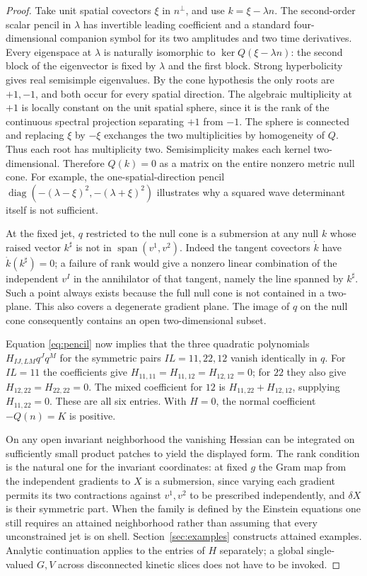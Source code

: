 \documentclass[11pt]{article}
\begin{document}
\begin{proof}
Take unit spatial covectors \(\xi\) in \(n^\perp\), and use \(k=\xi-\lambda n\). The second-order scalar pencil in \(\lambda\) has invertible leading coefficient and a standard four-dimensional companion symbol for its two amplitudes and two time derivatives. Every eigenspace at \(\lambda\) is naturally isomorphic to \(\ker Q(\xi-\lambda n)\): the second block of the eigenvector is fixed by \(\lambda\) and the first block. Strong hyperbolicity gives real semisimple eigenvalues. By the cone hypothesis the only roots are \(+1,-1\), and both occur for every spatial direction. The algebraic multiplicity at \(+1\) is locally constant on the unit spatial sphere, since it is the rank of the continuous spectral projection separating \(+1\) from \(-1\). The sphere is connected and replacing \(\xi\) by \(-\xi\) exchanges the two multiplicities by homogeneity of \(Q\). Thus each root has multiplicity two. Semisimplicity makes each kernel two-dimensional. Therefore \(Q(k)=0\) as a matrix on the entire nonzero metric null cone. For example, the one-spatial-direction pencil \(\operatorname{diag}(-(\lambda-\xi)^2,-(\lambda+\xi)^2)\) illustrates why a squared wave determinant itself is not sufficient.

At the fixed jet, \(q\) restricted to the null cone is a submersion at any null \(k\) whose raised vector \(k^\sharp\) is not in \(\operatorname{span}(v^1,v^2)\). Indeed the tangent covectors \(\dot k\) have \(\dot k(k^\sharp)=0\); a failure of rank would give a nonzero linear combination of the independent \(v^I\) in the annihilator of that tangent, namely the line spanned by \(k^\sharp\). Such a point always exists because the full null cone is not contained in a two-plane. This also covers a degenerate gradient plane. The image of \(q\) on the null cone consequently contains an open two-dimensional subset.

Equation \eqref{eq:pencil} now implies that the three quadratic polynomials \(H_{IJ,LM}q^Jq^M\) for the symmetric pairs \(IL=11,22,12\) vanish identically in \(q\). For \(IL=11\) the coefficients give \(H_{11,11}=H_{11,12}=H_{12,12}=0\); for \(22\) they also give \(H_{12,22}=H_{22,22}=0\). The mixed coefficient for \(12\) is \(H_{11,22}+H_{12,12}\), supplying \(H_{11,22}=0\). These are all six entries. With \(H=0\), the normal coefficient \(-Q(n)=K\) is positive.

On any open invariant neighborhood the vanishing Hessian can be integrated on sufficiently small product patches to yield the displayed form. The rank condition is the natural one for the invariant coordinates: at fixed \(g\) the Gram map from the independent gradients to \(X\) is a submersion, since varying each gradient permits its two contractions against \(v^1,v^2\) to be prescribed independently, and \(\delta X\) is their symmetric part. When the family is defined by the Einstein equations one still requires an attained neighborhood rather than assuming that every unconstrained jet is on shell. Section~\ref{sec:examples} constructs attained examples. Analytic continuation applies to the entries of \(H\) separately; a global single-valued \(G,V\) across disconnected kinetic slices does not have to be invoked.


\end{proof}
\end{document}
